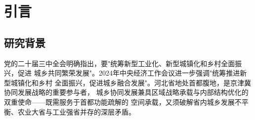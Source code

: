 \documentclass[12pt, a4paper, twoside]{ctexart}
\begin{document}
\tableofcontents
\newpage

\begin{abstract}
\noindent
城乡协同发展是推进中国式现代化的重要战略支撑，也是河北省在京津冀协同发展大局中
补短板、强弱项的核心任务。本报告综合运用\textbf{耦合协调度模型}、\textbf{障碍度模型}及
"社会—空间"关联耦合理论，基于2011—2023年河北省设区市面板数据，系统评估全省城乡
协同发展水平，深入分析时空演化格局、内部障碍因子及外部驱动机制，并结合城乡产业
协同发展平台建设实践提出政策建议。

研究发现：\textbf{（1）}2011—2023年，河北省城乡耦合协调度由\textbf{0.484}稳步提升至
\textbf{0.677}，整体处于中级协调阶段，乡村全面振兴相对滞后；
\textbf{（2）}全省城乡居民人均可支配收入比由2011年的2.98缩小至2023年的2.26，城乡
差距持续收窄，优于全国2.34的平均水平；
\textbf{（3）}产业兴旺不足、治理有效薄弱及公共服务资源配置失衡是制约协同发展的核心
障碍；
\textbf{（4）}数字普惠金融（$q=0.748$）、市场化水平（$q=0.658$）是最强外部驱动力；
\textbf{（5）}11个设区市城乡协同发展存在显著空间分异，呈现"冀中南$>$冀东$>$冀北"
梯度格局。

\vspace{4pt}
\noindent\textbf{关键词：}城乡协同发展；耦合协调度；乡村振兴；新型城镇化；京津冀；河北省

\vspace{4pt}
\noindent\textbf{中图分类号：}F299.2；F323\quad
\textbf{文献标识码：}A
\end{abstract}

\newpage

\section{引\quad 言}

\subsection{研究背景}

党的二十届三中全会明确指出，要"统筹新型工业化、新型城镇化和乡村全面振兴，促进
城乡共同繁荣发展"。2024年中央经济工作会议进一步强调"统筹推进新型城镇化和乡村
全面振兴，促进城乡融合发展"。河北省地处首都腹地，是京津冀协同发展战略的重要参与者，
城乡协同发展兼具区域战略承载与内部结构优化的双重使命——既需服务于首都功能疏解的
空间承载，又须破解省内城乡发展不平衡、农业大省与工业强省并存的深层矛盾。
\end{document}
